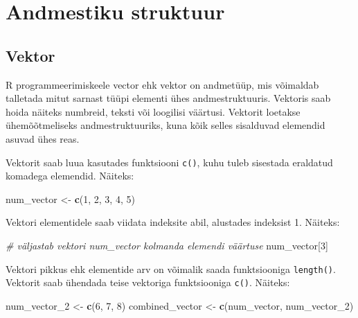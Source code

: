 \documentclass[
]{book}
\newenvironment{Shaded}{\begin{snugshade}}{\end{snugshade}}
\newcommand{\CommentTok}[1]{\textcolor[rgb]{0.56,0.35,0.01}{\textit{#1}}}
\newcommand{\DecValTok}[1]{\textcolor[rgb]{0.00,0.00,0.81}{#1}}
\newcommand{\FunctionTok}[1]{\textcolor[rgb]{0.13,0.29,0.53}{\textbf{#1}}}
\newcommand{\NormalTok}[1]{#1}
\newcommand{\OtherTok}[1]{\textcolor[rgb]{0.56,0.35,0.01}{#1}}
\renewenvironment{Shaded} {\begin{snugshade}\footnotesize} {\end{snugshade}}
\begin{document}
\section{Andmestiku struktuur}\label{andmestiku-struktuur}

\subsection{Vektor}\label{vektor}

R programmeerimiskeele vector ehk vektor on andmetüüp, mis võimaldab talletada mitut sarnast tüüpi elementi ühes andmestruktuuris. Vektoris saab hoida näiteks numbreid, teksti või loogilisi väärtusi. Vektorit loetakse ühemõõtmeliseks andmestruktuuriks, kuna kõik selles sisalduvad elemendid asuvad ühes reas.

Vektorit saab luua kasutades funktsiooni \texttt{c()}, kuhu tuleb sisestada eraldatud komadega elemendid. Näiteks:

\begin{Shaded}
\begin{Highlighting}[]
\NormalTok{num\_vector }\OtherTok{\textless{}{-}} \FunctionTok{c}\NormalTok{(}\DecValTok{1}\NormalTok{, }\DecValTok{2}\NormalTok{, }\DecValTok{3}\NormalTok{, }\DecValTok{4}\NormalTok{, }\DecValTok{5}\NormalTok{)}
\end{Highlighting}
\end{Shaded}

Vektori elementidele saab viidata indeksite abil, alustades indeksist 1. Näiteks:

\begin{Shaded}
\begin{Highlighting}[]
\CommentTok{\# väljastab vektori num\_vector kolmanda elemendi väärtuse}
\NormalTok{num\_vector[}\DecValTok{3}\NormalTok{] }
\end{Highlighting}
\end{Shaded}

Vektori pikkus ehk elementide arv on võimalik saada funktsiooniga \texttt{length()}. Vektorit saab ühendada teise vektoriga funktsiooniga \texttt{c()}. Näiteks:

\begin{Shaded}
\begin{Highlighting}[]
\NormalTok{num\_vector\_2 }\OtherTok{\textless{}{-}} \FunctionTok{c}\NormalTok{(}\DecValTok{6}\NormalTok{, }\DecValTok{7}\NormalTok{, }\DecValTok{8}\NormalTok{)}
\NormalTok{combined\_vector }\OtherTok{\textless{}{-}} \FunctionTok{c}\NormalTok{(num\_vector, num\_vector\_2)}
\end{Highlighting}
\end{Shaded}
\end{document}
